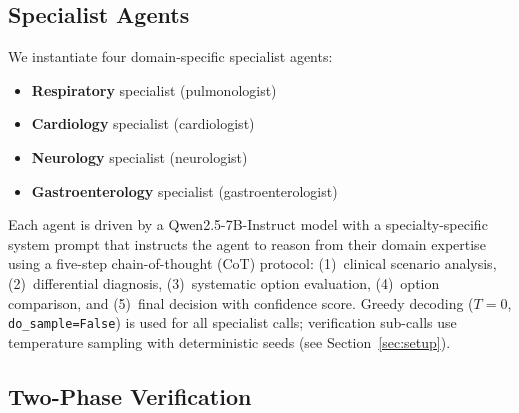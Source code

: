 \documentclass[10pt]{article}
\begin{document}
\subsection{Specialist Agents}
\label{sec:agents}

We instantiate four domain-specific specialist agents:
\begin{itemize}
    \item \textbf{Respiratory} specialist (pulmonologist)
    \item \textbf{Cardiology} specialist (cardiologist)
    \item \textbf{Neurology} specialist (neurologist)
    \item \textbf{Gastroenterology} specialist (gastroenterologist)
\end{itemize}

Each agent is driven by a Qwen2.5-7B-Instruct model \citep{qwen2025qwen25}
with a specialty-specific system prompt that instructs the agent to reason
from their domain expertise using a five-step chain-of-thought (CoT) protocol:
(1)~clinical scenario analysis, (2)~differential diagnosis, (3)~systematic
option evaluation, (4)~option comparison, and (5)~final decision with
confidence score.  Greedy decoding ($T=0$, \texttt{do\_sample=False}) is
used for all specialist calls; verification sub-calls use temperature
sampling with deterministic seeds (see Section~\ref{sec:setup}).

\subsection{Two-Phase Verification}
\label{sec:verification}
\end{document}
